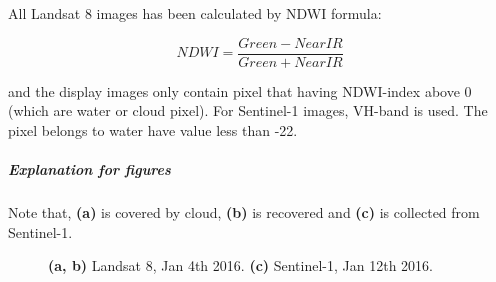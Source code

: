 All Landsat 8 images has been calculated by NDWI formula:

\begin{equation}
NDWI = \frac{Green - Near IR}{Green + Near IR}
\end{equation}

and the display images only contain pixel that having NDWI-index above 0 (which are water or cloud pixel). For Sentinel-1 images, VH-band is used. The pixel belongs to water have value less than -22.

\subparagraph{Explanation for figures} Note that, \textbf{(a)} is covered by cloud, \textbf{(b)} is recovered and \textbf{(c)} is collected from Sentinel-1. 

\begin{figure}[h!]
	\centering
	
	\centering
	\caption{
		\textbf{(a, b)} Landsat 8, Jan 4th 2016.
		\textbf{(c)} Sentinel-1, Jan 12th 2016.}
\end{figure}



